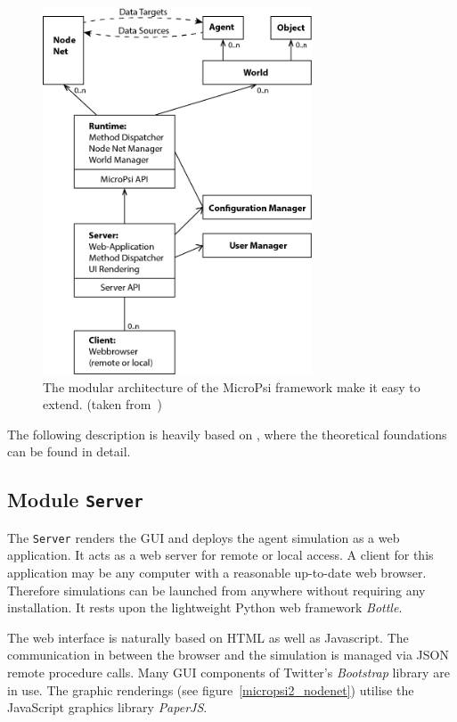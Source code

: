 \begin{figure}[h]
  \centering
    \includegraphics[width=8cm]{graphics/micropsi2_uml}
  \caption{The modular architecture of the MicroPsi framework make it easy to extend. (taken from~\cite{conf/agi/Bach12})}
  \label{micropsi2_modules}
\end{figure}

The following description is heavily based on \cite{conf/agi/Bach12}, where the theoretical foundations can be found in detail.

        \subsection{Module \texttt{Server}}
The \texttt{Server} renders the GUI and deploys the agent simulation as a web application. It acts as a web server for remote or local access. A client for this application may be any computer with a reasonable up-to-date web browser. Therefore simulations can be launched from anywhere without requiring any installation. It rests upon the lightweight Python web framework \emph{Bottle}.

The web interface is naturally based on HTML as well as Javascript. The communication in between the browser and the simulation is managed via JSON remote procedure calls. Many GUI components of Twitter's \emph{Bootstrap} library are in use. The graphic renderings (see figure~\ref{micropsi2_nodenet}) utilise the JavaScript graphics library \emph{PaperJS}. 

